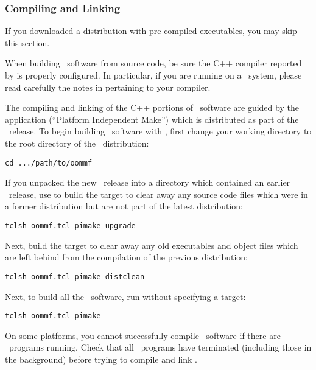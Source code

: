 \subsubsection{Compiling and Linking}\label{sec:install.compile}

If you downloaded a distribution with pre-compiled executables, you may
skip this section.

When building \OOMMF\ software from source code, be sure the C++
compiler reported by  is properly configured.
In particular, if you are running on a \Windows\ system, please read
carefully the notes in 
  pertaining to your
compiler.

The compiling and linking of the C++ portions of \OOMMF\ software 
are guided by the application
(``Platform Independent Make'') which 
is distributed as part of the \OOMMF\ release.
To begin building \OOMMF\ software with , first change
your working directory
to the root directory of the \OOMMF\ distribution:
\begin{verbatim}
cd .../path/to/oommf
\end{verbatim}

If you unpacked the new \OOMMF\ release into a directory 
which contained an earlier \OOMMF\ release, 
use  to build the target 
to clear away any source code files which were 
in a former distribution but are not part of the latest distribution:
\begin{verbatim}
tclsh oommf.tcl pimake upgrade
\end{verbatim}

Next, build the target  to clear away any old executables
and object files which are left behind from the compilation of the
previous distribution:
\begin{verbatim}
tclsh oommf.tcl pimake distclean
\end{verbatim}

Next, to build all the \OOMMF\ software, run  without
specifying a target:
\begin{verbatim}
tclsh oommf.tcl pimake
\end{verbatim}
On some platforms, you cannot successfully compile \OOMMF\ software if
there are \OOMMF\ programs running.  Check that all \OOMMF\ programs
have terminated (including those in the background) before trying to
compile and link \OOMMF.

